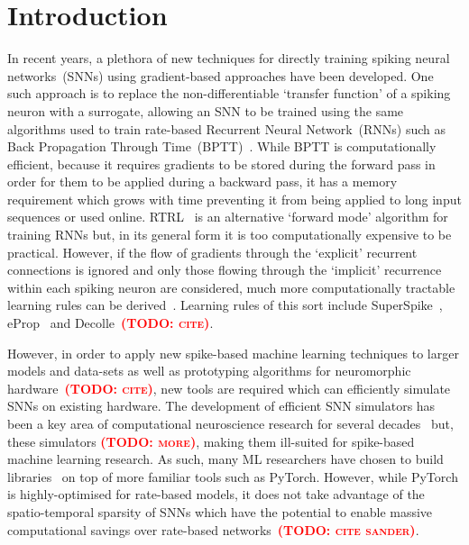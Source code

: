 \documentclass[sigconf,authordraft]{acmart}
\newcommand{\todo}[1]{\textbf{\textsc{\textcolor{red}{(TODO: #1)}}}}
\begin{document}


\maketitle

\section{Introduction}
In recent years, a plethora of new techniques for directly training spiking neural networks~(SNNs) using gradient-based approaches have been developed.
One such approach is to replace the non-differentiable `transfer function' of a spiking neuron with a surrogate, allowing an SNN to be trained using the same algorithms used to train rate-based Recurrent Neural Network~(RNNs) such as Back Propagation Through Time~(BPTT)~\citep{Bohte2011,Bellec2018,Zenke2021a}.
While BPTT is computationally efficient, because it requires gradients to be stored during the forward pass in order for them to be applied during a backward pass, it has a memory requirement which grows with time preventing it from being applied to long input sequences or used online.
RTRL~\citep{Williams1989} is an alternative `forward mode' algorithm for training RNNs but, in its general form it is too computationally expensive to be practical.
However, if the flow of gradients through the `explicit' recurrent connections is ignored and only those flowing through the `implicit' recurrence within each spiking neuron are considered, much more computationally tractable learning rules can be derived~\citep{Zenke2021}.
Learning rules of this sort include SuperSpike~\citep{Zenke2018}, eProp~\citep{Bellec2018} and Decolle~\todo{cite}.

However, in order to apply new spike-based machine learning techniques to larger models and data-sets as well as prototyping algorithms for neuromorphic hardware~\todo{cite}, new tools are required which can efficiently simulate SNNs on existing hardware. 
The development of efficient SNN simulators has been a key area of computational neuroscience research for several decades~\citep{carnevale2006neuron, Gewaltig2007, Golosio2021, Akar2019,Yavuz2016} but, these simulators \todo{more}, making them ill-suited for spike-based machine learning research.
As such, many ML researchers have chosen to build libraries~\citep{norse2021, SpikingJelly, eshraghian2021training,Hazan2018} on top of more familiar tools such as PyTorch.
However, while PyTorch is highly-optimised for rate-based models, it does not take advantage of the spatio-temporal sparsity of SNNs which have the potential to enable massive computational savings over rate-based networks~\todo{cite sander}.
\end{document}
